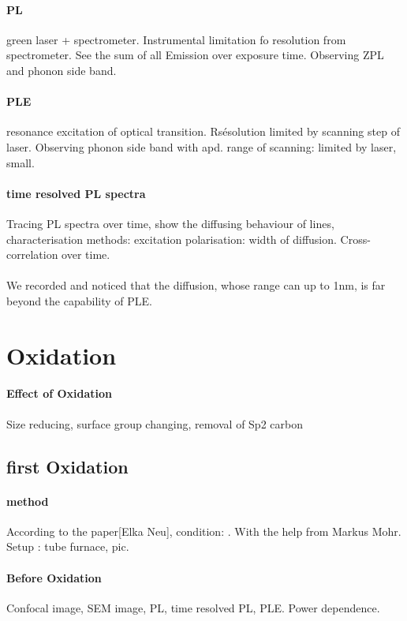 \paragraph{PL} green laser + spectrometer. Instrumental limitation fo resolution from spectrometer. See the sum of all Emission over exposure time. Observing ZPL and phonon side band.

\paragraph{PLE} resonance excitation of optical transition. Rsésolution limited by scanning step of laser. Observing phonon side band with apd. range of scanning: limited by laser, small.

\paragraph{time resolved PL spectra} Tracing PL spectra over time, show the diffusing behaviour of lines, characterisation methods: excitation polarisation: width of diffusion. Cross- correlation over time.
\paragraph{}We recorded and noticed that the diffusion, whose range can up to 1nm, is far beyond the capability of PLE. 

\section{Oxidation}
\paragraph{Effect of Oxidation} Size reducing, surface group changing, removal of Sp2 carbon

\subsection[first Oxidation]{first Oxidation}
\paragraph{method}According to the paper[Elka Neu], condition: . With the help from Markus Mohr. Setup : tube furnace, pic. 

\paragraph{Before Oxidation} Confocal image, SEM image, PL, time resolved PL, PLE. Power dependence.


